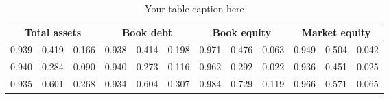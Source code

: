 
    \usepackage{booktabs} %
    \usepackage{graphicx} %

    \begin{table}[htbp]
      \centering
      \caption{Your table caption here}
      \label{tab:yourlabel}
    \begin{tabular}{lccccccccccc}
\toprule

    \multicolumn{3}{c}{Total assets} & \multicolumn{3}{c}{Book debt} & \multicolumn{3}{c}{Book equity} & \multicolumn{3}{c}{Market equity} \\
    \cmidrule(r{4pt}){1-3} \cmidrule(lr{4pt}){4-6} \cmidrule(lr{4pt}){7-9} \cmidrule(l{4pt}){10-12}
    \midrule
0.939 & 0.419 & 0.166 & 0.938 & 0.414 & 0.198 & 0.971 & 0.476 & 0.063 & 0.949 & 0.504 & 0.042 \\
0.940 & 0.284 & 0.090 & 0.940 & 0.273 & 0.116 & 0.962 & 0.292 & 0.022 & 0.936 & 0.451 & 0.025 \\
0.935 & 0.601 & 0.268 & 0.934 & 0.604 & 0.307 & 0.984 & 0.729 & 0.119 & 0.966 & 0.571 & 0.065 \\
\bottomrule
\end{tabular}

    \end{table}
    